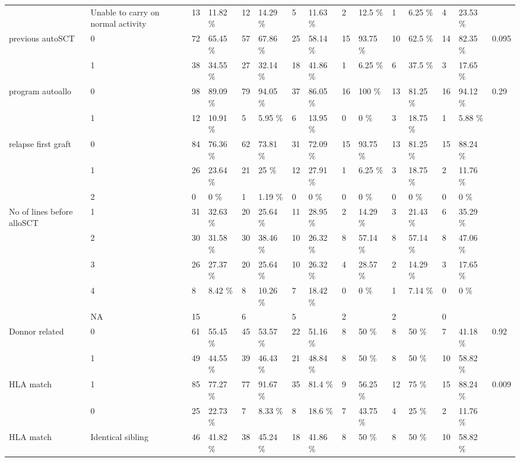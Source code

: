 \documentclass[a4paper,11pt] {article}
\begin{document}
\begin{landscape}
\begin{longtable}{lllllllllllllll}
   & Unable to carry on normal activity & 13 & 11.82 \% & 12 & 14.29 \% & 5 & 11.63 \% & 2 & 12.5 \% & 1 & 6.25 \% & 4 & 23.53 \% &  \\ 
  previous autoSCT & 0 & 72 & 65.45 \% & 57 & 67.86 \% & 25 & 58.14 \% & 15 & 93.75 \% & 10 & 62.5 \% & 14 & 82.35 \% & 0.095 \\ 
   & 1 & 38 & 34.55 \% & 27 & 32.14 \% & 18 & 41.86 \% & 1 & 6.25 \% & 6 & 37.5 \% & 3 & 17.65 \% &  \\ 
  program autoallo & 0 & 98 & 89.09 \% & 79 & 94.05 \% & 37 & 86.05 \% & 16 & 100 \% & 13 & 81.25 \% & 16 & 94.12 \% & 0.29 \\ 
   & 1 & 12 & 10.91 \% & 5 & 5.95 \% & 6 & 13.95 \% & 0 & 0 \% & 3 & 18.75 \% & 1 & 5.88 \% &  \\ 
  relapse first graft & 0 & 84 & 76.36 \% & 62 & 73.81 \% & 31 & 72.09 \% & 15 & 93.75 \% & 13 & 81.25 \% & 15 & 88.24 \% &  \\ 
   & 1 & 26 & 23.64 \% & 21 & 25 \% & 12 & 27.91 \% & 1 & 6.25 \% & 3 & 18.75 \% & 2 & 11.76 \% &  \\ 
   & 2 & 0 & 0 \% & 1 & 1.19 \% & 0 & 0 \% & 0 & 0 \% & 0 & 0 \% & 0 & 0 \% &  \\ 
  No of lines before alloSCT & 1 & 31 & 32.63 \% & 20 & 25.64 \% & 11 & 28.95 \% & 2 & 14.29 \% & 3 & 21.43 \% & 6 & 35.29 \% &  \\ 
   & 2 & 30 & 31.58 \% & 30 & 38.46 \% & 10 & 26.32 \% & 8 & 57.14 \% & 8 & 57.14 \% & 8 & 47.06 \% &  \\ 
   & 3 & 26 & 27.37 \% & 20 & 25.64 \% & 10 & 26.32 \% & 4 & 28.57 \% & 2 & 14.29 \% & 3 & 17.65 \% &  \\ 
   & 4 & 8 & 8.42 \% & 8 & 10.26 \% & 7 & 18.42 \% & 0 & 0 \% & 1 & 7.14 \% & 0 & 0 \% &  \\ 
   & NA & 15 &  & 6 &  & 5 &  & 2 &  & 2 &  & 0 &  &  \\ 
  Donnor related & 0 & 61 & 55.45 \% & 45 & 53.57 \% & 22 & 51.16 \% & 8 & 50 \% & 8 & 50 \% & 7 & 41.18 \% & 0.92 \\ 
   & 1 & 49 & 44.55 \% & 39 & 46.43 \% & 21 & 48.84 \% & 8 & 50 \% & 8 & 50 \% & 10 & 58.82 \% &  \\ 
  HLA match & 1 & 85 & 77.27 \% & 77 & 91.67 \% & 35 & 81.4 \% & 9 & 56.25 \% & 12 & 75 \% & 15 & 88.24 \% & 0.009 \\ 
   & 0 & 25 & 22.73 \% & 7 & 8.33 \% & 8 & 18.6 \% & 7 & 43.75 \% & 4 & 25 \% & 2 & 11.76 \% &  \\ 
  HLA match & Identical sibling & 46 & 41.82 \% & 38 & 45.24 \% & 18 & 41.86 \% & 8 & 50 \% & 8 & 50 \% & 10 & 58.82 \% &  \\ 

\end{longtable}
\end{landscape}
\end{document}
